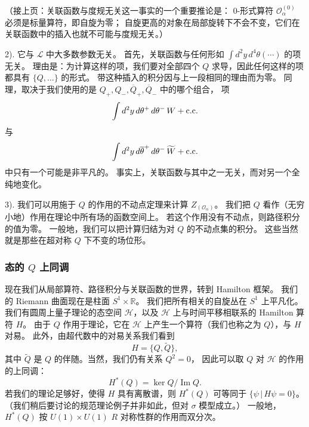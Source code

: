 （接上页：关联函数与度规无关这一事实的一个重要推论是：
$0$-形式算符 $\mathcal{O}^{(0)}_\alpha$ 必须是标量算符，即自旋为零；
自旋更高的对象在局部旋转下不会不变，它们在关联函数中的插入也就不可能与度规无关。）

2). 它与 $\mathcal{L}$ 中大多数参数无关。
首先，关联函数与任何形如 $\int d^2y\,d^4\theta(\cdots)$ 的项无关。
理由是：为计算这样的项，我们要对全部四个 $Q$ 求导，因此任何这样的项都具有 $\{Q,\dots\}$ 的形式。
带这种插入的积分因与上一段相同的理由而为零。
同理，取决于我们使用的是 $Q_+,Q_-,\overline{Q}_+,\overline{Q}_-$ 中的哪个组合，
项
\[
\int d^2y\,d\theta^+\,d\theta^-\,W+{\rm c.c.}
\]
与
\[
\int d^2y\,d\overline{\theta}^+\,d\theta^-\,\widetilde{W}+{\rm c.c.}
\]
中只有一个可能是非平凡的。
事实上，关联函数与其中之一无关，而对另一个全纯地变化。

3). 我们可以用施于 $Q$ 的作用的不动点定理来计算 $Z_{(\mathcal{O}_\alpha)}$。
我们把 $Q$ 看作（无穷小地）作用在理论中所有场的函数空间上。
若这个作用没有不动点，则路径积分的值为零。
一般地，我们可以把计算归结为对 $Q$ 的不动点集的积分。
这些当然就是那些在超对称 $Q$ 下不变的场位形。

\subsubsection{态的 $Q$ 上同调}

现在我们从局部算符、路径积分与关联函数的世界，转到 Hamilton 框架。
我们的 Riemann 曲面现在是柱面 $S^1\times\mathbb{R}$。
我们把所有相关的自旋丛在 $S^1$ 上平凡化。
我们有圆周上量子理论的态空间 $\mathcal{H}$，以及 $\mathcal{H}$ 上与时间平移相联系的 Hamilton 算符 $H$。
由于 $Q$ 作用于理论，它在 $\mathcal{H}$ 上产生一个算符（我们也称之为 $Q$），与 $H$ 对易。
此外，由超代数中的对易关系我们看到
\[
H=\{Q,\widetilde{Q}\},
\]
其中 $\widetilde{Q}$ 是 $Q$ 的伴随。当然，我们仍有关系 $Q^2=0$，
因此可以取 $Q$ 对 $\mathcal{H}$ 的作用的上同调：
\[
H^*(Q)=\ker Q/\operatorname{Im}Q.
\]
若我们的理论足够好，使得 $H$ 具有离散谱，则 $H^*(Q)$ 可等同于 $\{\psi\,|\,H\psi=0\}$。
（我们稍后要讨论的规范理论例子并非如此，但对 $\sigma$ 模型成立。）
一般地，$H^*(Q)$ 按 $U(1)\times U(1)$ $R$ 对称性群的作用而双分次。


